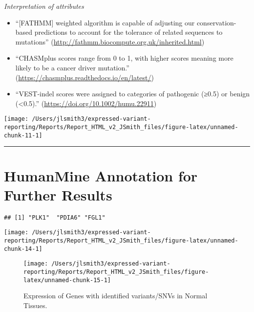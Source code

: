 \documentclass[
]{article}
\providecommand{\tightlist}{%
  \setlength{\itemsep}{0pt}\setlength{\parskip}{0pt}}
\begin{document}
\emph{Interpretation of attributes}

\begin{itemize}
\tightlist
\item
  ``{[}FATHMM{]} weighted algorithm is capable of adjusting our
  conservation-based predictions to account for the tolerance of related
  sequences to mutations''
  (\url{http://fathmm.biocompute.org.uk/inherited.html})
\item
  ``CHASMplus scores range from 0 to 1, with higher scores meaning more
  likely to be a cancer driver mutation.''
  (\url{https://chasmplus.readthedocs.io/en/latest/})
\item
  ``VEST‐indel scores were assigned to categories of pathogenic (≥0.5)
  or benign (\textless0.5).'' (\url{https://doi.org/10.1002/humu.22911})
\end{itemize}

\begin{center}\texttt{[image: /Users/jlsmith3/expressed-variant-reporting/Reports/Report\_HTML\_v2\_JSmith\_files/figure-latex/unnamed-chunk-11-1]} \end{center}

\begin{center}\rule{0.5\linewidth}{0.5pt}\end{center}

\hypertarget{humanmine-annotation-for-further-results}{%
\section{HumanMine Annotation for Further
Results}\label{humanmine-annotation-for-further-results}}

\begin{verbatim}
## [1] "PLK1"  "PDIA6" "FGL1"
\end{verbatim}

\begin{center}\texttt{[image: /Users/jlsmith3/expressed-variant-reporting/Reports/Report\_HTML\_v2\_JSmith\_files/figure-latex/unnamed-chunk-14-1]} \end{center}

\begin{figure}

{\centering \texttt{[image: /Users/jlsmith3/expressed-variant-reporting/Reports/Report\_HTML\_v2\_JSmith\_files/figure-latex/unnamed-chunk-15-1]} 

}

\caption{Expression of Genes with identified variants/SNVs in Normal Tissues.}\label{fig:unnamed-chunk-15}
\end{figure}
\end{document}

